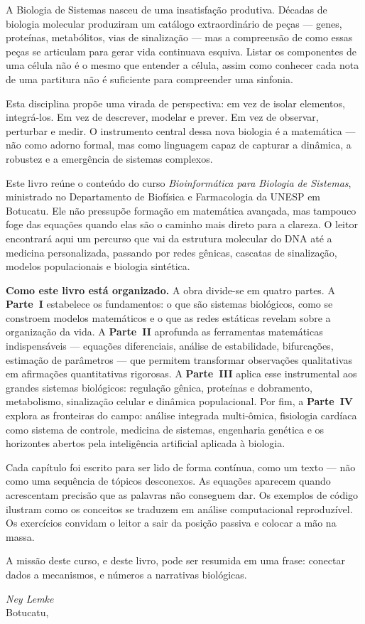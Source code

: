 A Biologia de Sistemas nasceu de uma insatisfação produtiva. Décadas de biologia molecular
produziram um catálogo extraordinário de peças --- genes, proteínas, metabólitos, vias de
sinalização --- mas a compreensão de como essas peças se articulam para gerar vida continuava
esquiva. Listar os componentes de uma célula não é o mesmo que entender a célula, assim como
conhecer cada nota de uma partitura não é suficiente para compreender uma sinfonia.

Esta disciplina propõe uma virada de perspectiva: em vez de isolar elementos, integrá-los.
Em vez de descrever, modelar e prever. Em vez de observar, perturbar e medir. O instrumento
central dessa nova biologia é a matemática --- não como adorno formal, mas como linguagem
capaz de capturar a dinâmica, a robustez e a emergência de sistemas complexos.

Este livro reúne o conteúdo do curso \textit{Bioinformática para Biologia de Sistemas},
ministrado no Departamento de Biofísica e Farmacologia da UNESP em Botucatu. Ele não
pressupõe formação em matemática avançada, mas tampouco foge das equações quando elas são
o caminho mais direto para a clareza. O leitor encontrará aqui um percurso que vai da
estrutura molecular do DNA até a medicina personalizada, passando por redes gênicas,
cascatas de sinalização, modelos populacionais e biologia sintética.

\medskip
\textbf{Como este livro está organizado.}
A obra divide-se em quatro partes. A \textbf{Parte~I} estabelece os fundamentos: o que são
sistemas biológicos, como se constroem modelos matemáticos e o que as redes estáticas revelam
sobre a organização da vida. A \textbf{Parte~II} aprofunda as ferramentas matemáticas
indispensáveis --- equações diferenciais, análise de estabilidade, bifurcações, estimação
de parâmetros --- que permitem transformar observações qualitativas em afirmações quantitativas
rigorosas. A \textbf{Parte~III} aplica esse instrumental aos grandes sistemas biológicos:
regulação gênica, proteínas e dobramento, metabolismo, sinalização celular e dinâmica
populacional. Por fim, a \textbf{Parte~IV} explora as fronteiras do campo: análise integrada
multi-ômica, fisiologia cardíaca como sistema de controle, medicina de sistemas,
engenharia genética e os horizontes abertos pela inteligência artificial aplicada à biologia.

\medskip
Cada capítulo foi escrito para ser lido de forma contínua, como um texto --- não como uma
sequência de tópicos desconexos. As equações aparecem quando acrescentam precisão que as
palavras não conseguem dar. Os exemplos de código ilustram como os conceitos se traduzem
em análise computacional reproduzível. Os exercícios convidam o leitor a sair da posição
passiva e colocar a mão na massa.

A missão deste curso, e deste livro, pode ser resumida em uma frase: conectar dados a
mecanismos, e números a narrativas biológicas.

\bigskip
\begin{flushright}
\textit{Ney Lemke}\\
Botucatu, \the\year
\end{flushright}
